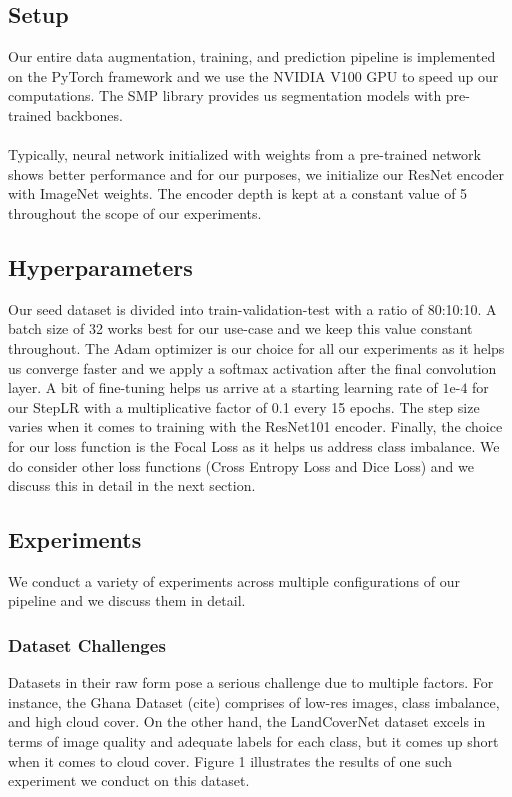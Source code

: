 \documentclass[conference]{IEEEtran}
\begin{document}
\subsection{Setup}
Our entire data augmentation, training, and prediction pipeline is implemented on the PyTorch framework and we use the NVIDIA V100 GPU to speed up our computations. The SMP library \cite{Yakubovskiy:2019} provides us segmentation models with pre-trained backbones. 
\\
\\Typically, neural network initialized with weights from a pre-trained network shows better performance and for our purposes, we initialize our ResNet encoder with ImageNet weights. The encoder depth is kept at a constant value of 5 throughout the scope of our experiments. 

\subsection{Hyperparameters}
Our seed dataset is divided into train-validation-test with a ratio of 80:10:10. A batch size of 32 works best for our use-case and we keep this value constant throughout. The Adam optimizer is our choice for all our experiments as it helps us converge faster and we apply a softmax activation after the final convolution layer. A bit of fine-tuning helps us arrive at a starting learning rate of $1\text{e-}4$ for our StepLR with a multiplicative factor of 0.1 every 15 epochs. The step size varies when it comes to training with the ResNet101 encoder. Finally, the choice for our loss function is the Focal Loss as it helps us address class imbalance. We do consider other loss functions (Cross Entropy Loss and Dice Loss) and we discuss this in detail in the next section.
\subsection{Experiments}
We conduct a variety of experiments across multiple configurations of our pipeline and we discuss them in detail.

\subsubsection{Dataset Challenges}
Datasets in their raw form pose a serious challenge due to multiple factors. For instance, the Ghana Dataset (cite) comprises of low-res images, class imbalance, and high cloud cover. On the other hand, the LandCoverNet dataset excels in terms of image quality and adequate labels for each class, but it comes up short when it comes to cloud cover. Figure 1 illustrates the results of one such experiment we conduct on this dataset.
\end{document}
